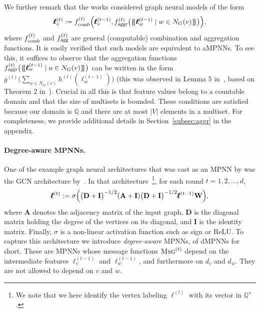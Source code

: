 \documentclass[10pt,a4paper]{article}
\theoremstyle{definition}
\newcommand*{\lmset}{\{\mskip-5mu\{}
\newcommand*{\rmset}{\}\mskip-5mu\}}
\begin{document}
We further remark that the works \citep{XuHLJ19,grohewl}  considered graph neural models of the form
$$
\pmb{\ell}^{(t)}_{v}:=
f_{\textsl{comb}}^{(t)}\Bigl(
\pmb{\ell}_{v}^{(t-1)},f_{\textsl{aggr}}^{(t)}\bigl(\lmset \pmb{\ell}^{(t-1)}_{w} \mid w \in N_G(v) \rmset\bigr)
\Bigr),
$$
where $f_{\textsl{comb}}^{(t)}$ and  $f_{\textsl{agg}}^{(t)}$ are general (computable) combination and aggregation functions. It is easily verified that such models are equivalent to aMPNNs. To see this, it suffices to observe that the aggregation functions $f_{\textsl{aggr}}^{(t)}\bigl(\lmset \pmb{\ell}^{(t-1)}_{w} \mid u \in N_G(v) \rmset\bigr)$ can be written in the form $g^{(t)}\bigl(\sum_{w\in N_G(v)} h^{(t)}(\pmb{\ell}^{(t-1)}_{w})\bigr)$ (this was observed in Lemma 5 in~\citep{XuHLJ19}, based on Theorem 2 in~\citep{ZaheerKRPSS17}). Crucial in all this is that feature values belong to a countable domain and that the size of multisets is bounded. These conditions are satisfied because our domain is $\mathbb{Q}$ and there are at most $|V|$ elements in a multiset. For completeness, we provide additional details in Section~\ref{subsec:aggr} in the appendix.



\paragraph{Degree-aware MPNNs.} 
One of the example graph neural architectures that was cast as an MPNN by \citet{GilmerSRVD17}
was the GCN architecture by~\citet{KipfW16}. In that architecture~\footnote{We note that we here identify the vertex labeling $\pmb{\ell}^{(t)}$ with its vector in $\mathbb{Q}^s$.}, for each round $t=1,2,\ldots,d$,
\begin{equation}
\pmb{\ell}^{(t)}:=\sigma\Bigl(\bigl(\mathbf{D}+\mathbf{I}\bigr)^{-1/2} (\mathbf{A}+\mathbf{I})\bigl(\mathbf{D}+\mathbf{I}\bigr)^{-1/2} \pmb{\ell}^{(t-1)}\mathbf{W}\Bigr), \label{GNN:Kipf}
\end{equation}
where $\mathbf{A}$ denotes the adjacency matrix of the input graph, $\mathbf{D}$ is the diagonal matrix holding the degree of the vertices on its diagonal, and $\mathbf{I}$ is the identity matrix. Finally, $\sigma$ is a non-linear activation function such as sign or ReLU. To capture this architecture we  introduce \textit{degree-aware} MPNNs, of dMPNNs for short. These are MPNNs
whose message functions $\textsc{Msg}^{(t)}$ depend on the intermediate features $\pmb{\ell}^{(t-1)}_v$ and $\pmb{\ell}^{(t-1)}_w$, and furthermore on $d_v$ and $d_w$. They are not allowed to depend on  $v$ and $w$.
\end{document}
